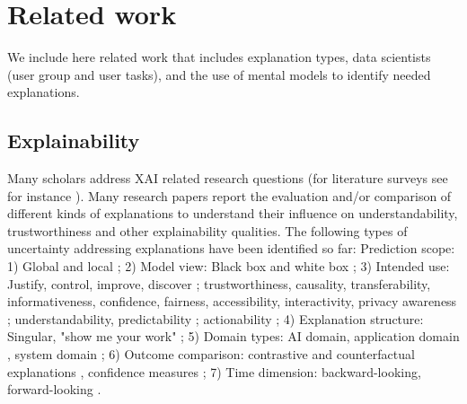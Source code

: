 \section{Related work}
\label{sec:RelatedWork}

We include here related work that includes explanation types, data scientists (user group and user tasks), and the use of mental models to identify needed explanations.


\subsection{Explainability}

Many scholars address XAI related research questions (for literature surveys see for instance \cite{Adadi2018-article,Angelov2021-article,Dosilovic2018-inproceedings,Guidotti2019-article,Hu2021-proceedings,Islam2022-article,Mueller2019-article,Vilone2020-article}). Many research papers report the evaluation and/or comparison of different kinds of explanations to understand their influence on understandability, trustworthiness and other explainability qualities. The following types of uncertainty addressing explanations have been identified so far: Prediction scope: 1) Global and local \cite{Arrieta2020-article,Adadi2018-article,Hoffman2018-article}; 2) Model view: Black box and white box \cite{Rudin2019-article}; 3) Intended use: Justify, control, improve, discover \cite[p. 52142--52143]{Adadi2018-article}; trustworthiness, causality, transferability, informativeness, confidence, fairness, accessibility, interactivity, privacy awareness \cite[p. 8--10]{Arrieta2020-article}; understandability, predictability \cite[p. 8]{Mohseni2021-article}; actionability \cite{Degen2023-inproceedings}; 4) Explanation structure: Singular, "show me your work" \cite{Degen2023-inproceedings}; 5) Domain types: AI domain, application domain \cite{Degen2023-inproceedings}, system domain \cite{Degen2024-inproceedings}; 6) Outcome comparison: contrastive and counterfactual explanations \cite{Miller2019ExplanationIA,Stepin2021-contrastive_counterfactual_explanations-article}, confidence measures \cite{Waa2020_ConfidenceLevel_2020,Zhang2020_Confidence_2020}; 7) Time dimension: backward-looking, forward-looking \cite{Degen2024-inproceedings}.


